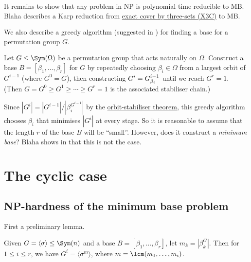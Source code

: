 It remains to show that any problem in NP is polynomial time reducible to MB. Blaha describes a Karp reduction from \hyperref[eg:X3C]{exact cover by three-sets (X3C)} to MB. 

We also describe a greedy algorithm (suggested in \cite{brown1989}) for finding a base for a permutation group $G$. 

\begin{algorithm}\label{alg:blaha_greedy_base}
    Let $G \leq \Sym(\Omega)$ be a permutation group that acts naturally on $\Omega$. Construct a base $B = [\beta_1,\dotsc,\beta_r]$ for $G$ by repeatedly choosing $\beta_i \in \Omega$ from a largest orbit of $G^{i-1}$ (where $G^0 = G$), then constructing $G^i = \added{2}{G^{i-1}_{\beta_i}}$ until we reach $G^r = 1$. (Then $G = G^0 \geq G^1 \geq \dotsb \geq G^r = 1$ is the associated stabiliser chain.)
\end{algorithm}

Since $|G^i| = |G^{i-1}|/|\beta_i^{G^{i-1}}|$ by the \hyperref[thm:orbit_stabiliser]{orbit-stabiliser theorem}, this greedy algorithm chooses $\beta_i$ that minimises $|G^i|$ at every stage. So it is reasonable to assume that the length $r$ of the base $B$ will be ``small''. However, does it construct a \textit{minimum base}? Blaha shows in \cite{blaha1992} that this is not the case.

\section{The cyclic case}

\subsection{NP-hardness of the minimum base problem}

First a preliminary lemma.

\begin{lemma}\label{lem:blaha_cyclic_stabiliser}
    Given $G = \langle \sigma \rangle \leq \Sym(n)$ and a base $B = [\beta_1,\dotsc,\beta_r]$, let $m_k = |\beta_k^G|$. Then for $1 \leq i \leq r$, we have $G^i = \langle \sigma^m \rangle$, where $m = \lcm(m_1,\dotsc,m_i)$.
\end{lemma}

